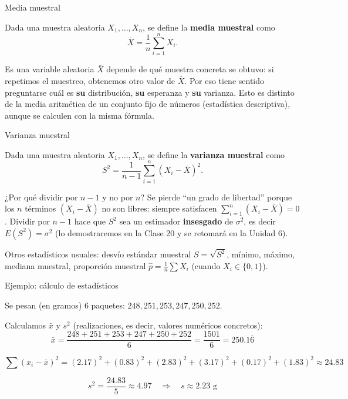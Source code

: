 \documentclass[aspectratio=169,11pt]{beamer}
\begin{document}
\begin{frame}{Media muestral}
\begin{definition}
Dada una muestra aleatoria $X_1,\dots,X_n$, se define la \textbf{media muestral} como
$$\bar X = \frac{1}{n}\sum_{i=1}^{n} X_i.$$
\end{definition}

\begin{alertblock}{Es una variable aleatoria}
$\bar X$ depende de qué muestra concreta se obtuvo: si repetimos el muestreo, obtenemos otro valor de $\bar X$. Por eso tiene sentido preguntarse cuál es \textbf{su} distribución, \textbf{su} esperanza y \textbf{su} varianza. Esto es distinto de la media aritmética de un conjunto fijo de números (estadística descriptiva), aunque se calculen con la misma fórmula.
\end{alertblock}
\end{frame}

\begin{frame}{Varianza muestral}
\begin{definition}
Dada una muestra aleatoria $X_1,\dots,X_n$, se define la \textbf{varianza muestral} como
$$S^2 = \frac{1}{n-1}\sum_{i=1}^{n} (X_i - \bar X)^2.$$
\end{definition}

\begin{alertblock}{¿Por qué dividir por $n-1$ y no por $n$?}
Se pierde ``un grado de libertad'' porque los $n$ términos $(X_i-\bar X)$ no son libres: siempre satisfacen $\sum_{i=1}^n (X_i - \bar X) = 0$. Dividir por $n-1$ hace que $S^2$ sea un estimador \textbf{insesgado} de $\sigma^2$, es decir $E(S^2)=\sigma^2$ (lo demostraremos en la Clase 20 y se retomará en la Unidad 6).
\end{alertblock}

Otros estadísticos usuales: desvío estándar muestral $S = \sqrt{S^2}$, mínimo, máximo, mediana muestral, proporción muestral $\hat p = \frac{1}{n}\sum X_i$ (cuando $X_i \in \{0,1\}$).
\end{frame}

\begin{frame}{Ejemplo: cálculo de estadísticos}
\begin{example}
Se pesan (en gramos) 6 paquetes: $248, 251, 253, 247, 250, 252$.

Calculamos $\bar x$ y $s^2$ (realizaciones, es decir, valores numéricos concretos):
$$\bar x = \frac{248+251+253+247+250+252}{6} = \frac{1501}{6} = 250.1\overline{6}$$

$$\sum (x_i-\bar x)^2 = (2.17)^2+(0.83)^2+(2.83)^2+(3.17)^2+(0.17)^2+(1.83)^2 \approx 24.83$$

$$s^2 = \frac{24.83}{5} \approx 4.97 \quad \Rightarrow \quad s \approx 2.23 \text{ g}$$
\end{example}

\end{frame}
\end{document}
